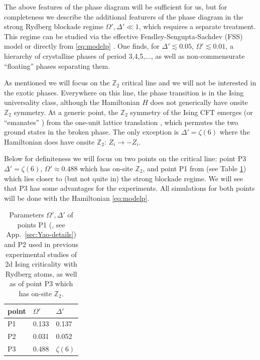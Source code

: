 \documentclass[a4paper,12pt]{article}
\theoremstyle{remark}
\theoremstyle{theorem}
\begin{document}
The above features of the phase diagram will be sufficient for us, but for
completeness we describe the additional featurers of the phase diagram in the
strong Rydberg blockade regime $\Omega', \Delta' \ll 1$, which requires a
separate treatment. This regime can be studied via the effective
Fendley-Sengupta-Sachdev (FSS) model {\cite{FSS}} or directly from
\eqref{eq:modelp} {\cite{Keesling:2018ish,Rader:2019syq}}. One finds, for
$\Delta' \lesssim 0.05$, $\Omega' \lesssim 0.01$, a hierarchy of crystalline
phases of period 3,4,5,..., as well as non-commensurate ``floating'' phases
separating them.

As mentioned we will focus on the $\mathbb{Z}_2$ critical line and we will not
be interested in the exotic phases. Everywhere on this line, the phase
transition is in the Ising universality class, although the Hamiltonian
$H$ does not generically have onsite $\mathbb{Z}_2$ symmetry. At a
generic point, the $\mathbb{Z}_2$ symmetry of the Ising CFT emerges (or
``emanates'' {\cite{Seiberg:2023cdc}}) from the one-unit lattice translation
{\cite{Slagle:2021ene}}, which permutes the two ground states in the broken
phase. The only exception is $\Delta' = \zeta (6)$ where the Hamiltonian does
have onsite $\mathbb{Z}_2$: $Z_i \to - Z_i$.

Below for definiteness we will focus on two points on the critical line:
point P3 $\Delta' = \zeta (6)$, $\Omega' \approx 0.488$ which has on-site
$\mathbb{Z}_2$, and point P1 from {\cite{Fang:2024uyf}} (see Table
\ref{tab:params}) which lies closer to (but not quite in) the strong blockade
regime. We will see that P3 has some advantages for the experiments. All
simulations for both points will be done with the Hamiltonian
\eqref{eq:modelp}.

\begin{table}[h]
	\centering
	\begin{tabular}{lll}
		\toprule
		point & $\Omega'$ & $\Delta'$\\\midrule
		P1{\cite{Fang:2024uyf}} & 0.133 & 0.137\\
		P2{\cite{Sun:2026aqf}} & 0.031 & 0.052\\
		P3 & $0.488$ & $\zeta (6)$\\
		\bottomrule
	\end{tabular}
	\caption{\label{tab:params}Parameters $\Omega', \Delta'$ of points P1 (\cite{Fang:2024uyf}, see App.~\ref{sec:Yao-details}) and P2
		\cite{Sun:2026aqf} used in previous experimental studies of 2d Ising criticality with Rydberg
		atoms, as well as of point P3 which has
		on-site $\mathbb{Z}_2$. }
\end{table}
\end{document}
